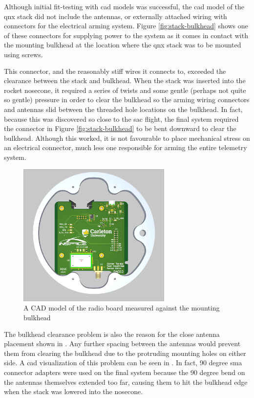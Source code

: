 Although initial fit-testing with \gls{cad} models was successful, the \gls{cad} model of the \gls{qnx} stack did not
include the antennas, or externally attached wiring with connectors for the electrical arming system. Figure
\ref{fig:stack-bulkhead} shows one of these connectors for supplying power to the system as it comes in contact with
the mounting bulkhead at the location where the \gls{qnx} stack was to be mounted using screws.

This connector, and the reasonably stiff wires it connects to, exceeded the clearance between the stack and bulkhead.
When the stack was inserted into the rocket nosecone, it required a series of twists and some gentle (perhaps not quite so gentle) pressure in order to clear the bulkhead so the arming wiring connectors and antennas slid between the threaded hole locations on the bulkhead. In fact, because this was discovered so close to the \gls{sac} flight, the final system required the connector in Figure \ref{fig:stack-bulkhead} to be bent downward to clear the bulkhead. Although this worked, it is not favourable to place mechanical stress on an electrical connector, much less one responsible for arming the entire telemetry system.

\begin{figure}[H]
    \center
    \includegraphics[width=3in]{assets/images/rad-cad.png}
    \caption{A CAD model of the radio board measured against the mounting bulkhead}
    \label{fig:rad-cad}
\end{figure}

The bulkhead clearance problem is also the reason for the close antenna placement shown in . Any further spacing between the antennas would prevent them from clearing the bulkhead due to the protruding mounting holes on either side. A \gls{cad} visualization of this problem can be seen in . In fact, 90 degree \gls{sma} connector adapters were used on the final system because the 90 degree bend on the antennas themselves extended too far, causing them to hit the bulkhead edge when the stack was lowered into the nosecone.


